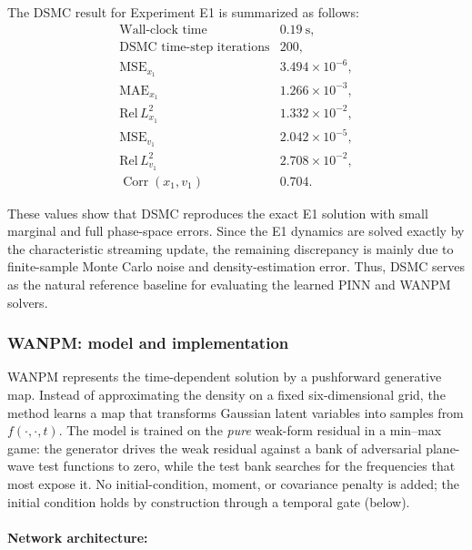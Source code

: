 \documentclass[11pt]{article}
\theoremstyle{plain}
\begin{document}
The DSMC result for Experiment E1 is summarized as follows:
\begin{equation*}
\begin{array}{ll}
\text{Wall-clock time} & 0.19\ \mathrm{s},\\
\text{DSMC time-step iterations} & 200,\\
\mathrm{MSE}_{x_1} & 3.494\times 10^{-6},\\
\mathrm{MAE}_{x_1} & 1.266\times 10^{-3},\\
\mathrm{Rel}\,L^2_{x_1} & 1.332\times 10^{-2},\\
\mathrm{MSE}_{v_1} & 2.042\times 10^{-5},\\
\mathrm{Rel}\,L^2_{v_1} & 2.708\times 10^{-2},\\
\operatorname{Corr}(x_1,v_1) & 0.704.
\end{array}
\end{equation*}

These values show that DSMC reproduces the exact E1 solution with small marginal and full phase-space errors. Since the E1 dynamics are solved exactly by the characteristic streaming update, the remaining discrepancy is mainly due to finite-sample Monte Carlo noise and density-estimation error. Thus, DSMC serves as the natural reference baseline for evaluating the learned PINN and WANPM solvers.


\subsubsection{WANPM: model and implementation}
\label{sec:wanpm}

WANPM represents the time-dependent solution by a pushforward generative map. Instead of approximating the density on a fixed six-dimensional grid, the method learns a map that transforms Gaussian latent variables into samples from \(f(\cdot,\cdot,t)\). The model is trained on the \emph{pure} weak-form residual in a min--max game: the generator drives the weak residual against a bank of adversarial plane-wave test functions to zero, while the test bank searches for the frequencies that most expose it. No initial-condition, moment, or covariance penalty is added; the initial condition holds by construction through a temporal gate (below).


\paragraph{Network architecture:}
\end{document}

